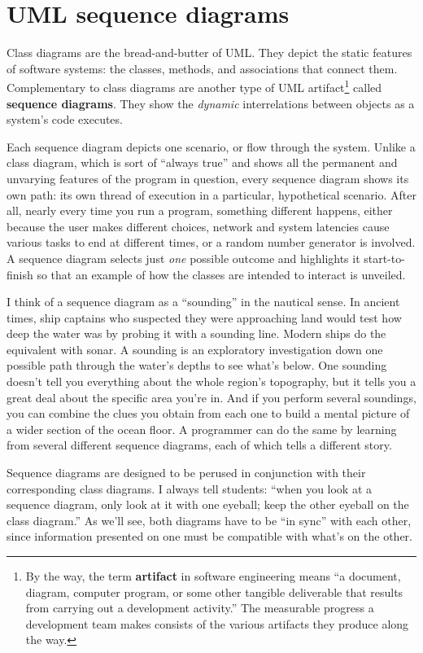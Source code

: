 
\chapter{UML sequence diagrams}
\label{artifact}

Class diagrams are the bread-and-butter of UML. They depict the static
features of software systems: the classes, methods, and associations that
connect them. Complementary to class diagrams are another type of UML
artifact\footnote{By the way, the term \textbf{artifact} in software
engineering means ``a document, diagram, computer program, or some other
tangible deliverable that results from carrying out a development activity.''
The measurable progress a development team makes consists of the various
artifacts they produce along the way.} called \textbf{sequence diagrams}. They
show the \textit{dynamic} interrelations between objects as a system's code
executes.

Each sequence diagram depicts one scenario, or flow through the system. Unlike
a class diagram, which is sort of ``always true'' and shows all the permanent
and unvarying features of the program in question, every sequence diagram
shows its own path: its own thread of execution in a particular, hypothetical
scenario. After all, nearly every time you run a program, something different
happens, either because the user makes different choices, network and system
latencies cause various tasks to end at different times, or a random number
generator is involved. A sequence diagram selects just \textit{one} possible
outcome and highlights it start-to-finish so that an example of how the
classes are intended to interact is unveiled.

I think of a sequence diagram as a ``sounding'' in the nautical sense. In
ancient times, ship captains who suspected they were approaching land would
test how deep the water was by probing it with a sounding line. Modern ships
do the equivalent with sonar. A sounding is an exploratory investigation down
one possible path through the water's depths to see what's below. One sounding
doesn't tell you everything about the whole region's topography, but it tells
you a great deal about the specific area you're in. And if you perform several
soundings, you can combine the clues you obtain from each one to build a
mental picture of a wider section of the ocean floor. A programmer can do the
same by learning from several different sequence diagrams, each of which
tells a different story.

Sequence diagrams are designed to be perused in conjunction with their
corresponding class diagrams. I always tell students: ``when you look at a
sequence diagram, only look at it with one eyeball; keep the other eyeball on
the class diagram.'' As we'll see, both diagrams have to be ``in sync'' with
each other, since information presented on one must be compatible with what's
on the other.

